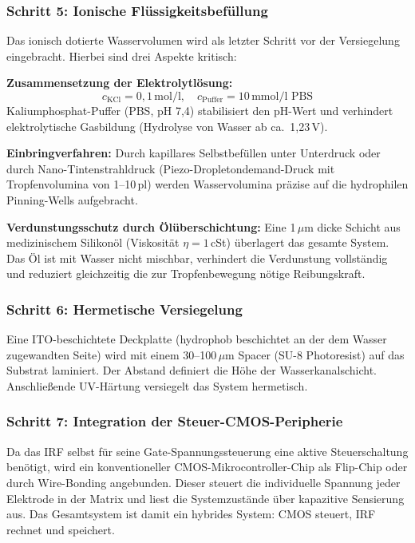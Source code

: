 ﻿\documentclass[a4paper,12pt]{scrreprt}
\theoremstyle{definition}
\begin{document}
\subsubsection{Schritt 5: Ionische Flüssigkeitsbefüllung}

Das ionisch dotierte Wasservolumen wird als letzter Schritt vor der Versiegelung
eingebracht. Hierbei sind drei Aspekte kritisch:

\textbf{Zusammensetzung der Elektrolytlösung:}
\begin{equation}
	c_{\mathrm{KCl}} = 0{,}1\,\text{mol/l}, \quad c_{\mathrm{Puffer}} = 10\,\text{mmol/l PBS}
	\label{eq:elektrolytkonzentration}
\end{equation}
Kaliumphosphat-Puffer (PBS, pH 7{,}4) stabilisiert den pH-Wert und verhindert
elektrolytische Gasbildung (Hydrolyse von Wasser ab ca.\ 1{,}23\,V).

\textbf{Einbringverfahren:}
Durch kapillares Selbstbefüllen unter Unterdruck oder durch Nano-Tintenstrahldruck
(Piezo-Dropletondemand-Druck mit Tropfenvolumina von 1--10\,pl) werden
Wasservolumina präzise auf die hydrophilen Pinning-Wells aufgebracht.

\textbf{Verdunstungsschutz durch Ölüberschichtung:}
Eine 1\,$\mu$m dicke Schicht aus medizinischem Silikonöl (Viskosität
$\eta = 1$\,cSt) überlagert das gesamte System. Das Öl ist mit Wasser
nicht mischbar, verhindert die Verdunstung vollständig und reduziert
gleichzeitig die zur Tropfenbewegung nötige Reibungskraft.

\subsubsection{Schritt 6: Hermetische Versiegelung}

Eine ITO-beschichtete Deckplatte (hydrophob beschichtet an der dem Wasser
zugewandten Seite) wird mit einem 30--100\,$\mu$m Spacer (SU-8 Photoresist)
auf das Substrat laminiert. Der Abstand definiert die Höhe der Wasserkanalschicht.
Anschließende UV-Härtung versiegelt das System hermetisch.

\subsubsection{Schritt 7: Integration der Steuer-CMOS-Peripherie}

Da das IRF selbst für seine Gate-Spannungssteuerung eine aktive Steuerschaltung
benötigt, wird ein konventioneller CMOS-Mikrocontroller-Chip als Flip-Chip
oder durch Wire-Bonding angebunden. Dieser steuert die individuelle Spannung
jeder Elektrode in der Matrix und liest die Systemzustände über kapazitive
Sensierung aus. Das Gesamtsystem ist damit ein hybrides System: CMOS steuert,
IRF rechnet und speichert.
\end{document}
